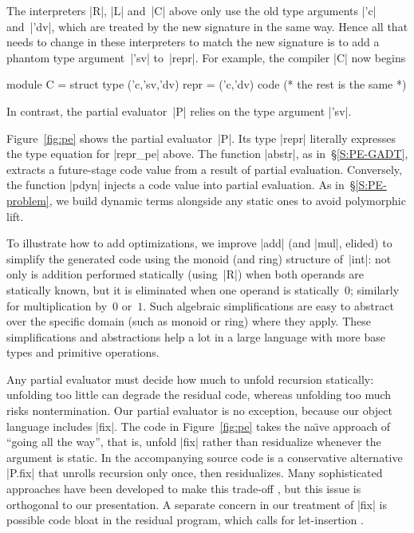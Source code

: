 The interpreters |R|, |L| and~|C| above only use the old
type arguments |'c| and~|'dv|, which are treated by the new signature
in the same way.  Hence all that needs to change in these interpreters
to match the new signature is to add a phantom type
argument~|'sv| to~|repr|.
For example, the compiler |C| now begins
\begin{code}
module C = struct
  type ('c,'sv,'dv) repr = ('c,'dv) code
  (* the rest is the same *)
\end{code}
In contrast, the partial evaluator~|P| relies on the type argument |'sv|.

Figure~\ref{fig:pe} shows the partial evaluator~|P|.
Its type |repr| literally expresses the type equation for |repr_pe| above.
The function |abstr|, as in~\S\ref{S:PE-GADT},
extracts a future-stage code value from a result of
partial evaluation.  Conversely, the function |pdyn| injects a
code value into partial evaluation. As
in~\S\ref{S:PE-problem}, we build dynamic terms alongside
any static ones to avoid polymorphic lift.

To illustrate how to add optimizations, we improve |add| (and |mul|,
elided) to simplify the generated code using the monoid (and ring)
structure of~|int|: not only is addition performed statically
(using~|R|) when both operands are statically known, but it is
eliminated when one operand is statically~$0$; similarly for
multiplication by~$0$ or~$1$.  Such algebraic simplifications are easy
to abstract over the specific domain (such as monoid or ring) where they
apply.  These simplifications and abstractions help a lot in a large
language with more base types and primitive operations.

Any partial evaluator must decide how much to unfold recursion
statically: unfolding too little can degrade the residual code, whereas
unfolding too much risks nontermination.  Our partial evaluator is no
exception, because our object language includes |fix|.  The code in
Figure~\ref{fig:pe} takes the na\"\i ve approach of ``going all the
way'', that is, unfold |fix| rather than residualize whenever the
argument is static.  In the accompanying source code is a conservative
alternative |P.fix| that unrolls recursion only once, then residualizes.
Many sophisticated approaches have been developed to make this trade-off
\cite{jones-partial}, but this issue is orthogonal to our presentation.
A separate concern in our treatment of |fix| is possible code bloat in
the residual program, which calls for let-insertion
\cite{SwadiTahaKiselyovPasalic2006}.

